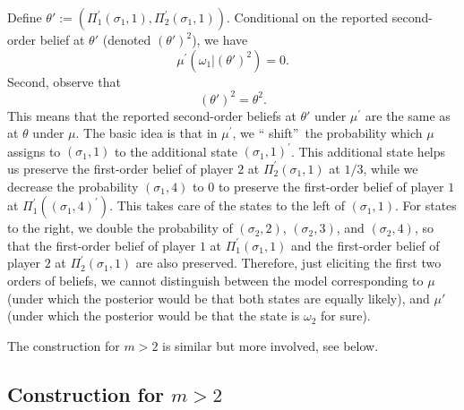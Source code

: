 \documentclass[12pt,reqno]{amsart}
\begin{document}
Define $\theta' := \left( \Pi
_{1}^{\prime }\left( \sigma_{1},1\right) ,\Pi _{2}^{\prime }\left( \sigma_{1},1\right)
\right)$. Conditional on the reported second-order belief at $\theta'$ (denoted $(\theta')^2$), we have
\[
\mu ^{\prime }\left( \omega _{1}|(\theta')^2\right)
=0\text{.}
\]%
Second, observe that 
\[
(\theta')^{2}=\theta^{2}\text{.}
\]
This means that the reported second-order beliefs at $\theta'$ under $\mu^{\prime}$ are the same as at $\theta$ under $\mu$. The
basic idea is that in $\mu ^{\prime }$, we \textquotedblleft
shift\textquotedblright\ the probability which $\mu $ assigns to $\left(
\sigma_{1},1\right) $ to the additional state $\left( \sigma_{1},1\right) ^{\prime }$.
This additional state helps us preserve the first-order belief of player $2$
at $\Pi _{2}^{\prime }\left( \sigma_{1},1\right) $ at $1/3$, while we
decrease the probability $\left( \sigma_{1},4\right) $ to $0$ to preserve the
first-order belief of player $1$ at $\Pi _{1}^{\prime }\left( \left(
\sigma_{1},4\right) ^{\prime }\right) $. This takes care of the states to the
left of $\left( \sigma_{1},1\right) $. For states to the right, we double the
probability of $\left( \sigma_{2},2\right) $, $\left( \sigma_{2},3\right) $, and $%
\left( \sigma_{2},4\right) $, so that the first-order belief of player $1$ at $\Pi
_{1}^{\prime }\left( \sigma_{1},1\right) $ and the first-order belief of player $2
$ at $\Pi_{2}^{\prime }\left( \sigma_{1},1\right) $ are also preserved. Therefore, just eliciting the first two orders of beliefs, we cannot distinguish between the model corresponding to $\mu$ (under which the posterior would be that both states are equally likely), and $\mu'$ (under which the posterior would be that the state is $\omega_2$ for sure). 

The construction for $m>2$ is similar but more involved, see below.

\subsection{Construction for \texorpdfstring{$m>2$}{m>2}}\label{app:higher-order}
\end{document}
